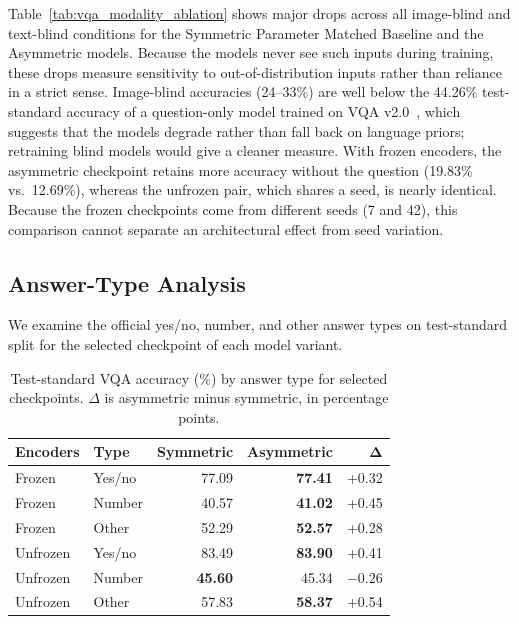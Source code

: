 \documentclass[conference]{IEEEtran}
\begin{document}
Table~\ref{tab:vqa_modality_ablation} shows major drops across all image-blind and text-blind conditions for the Symmetric Parameter Matched Baseline and the Asymmetric models. Because the models never see such inputs during training, these drops measure sensitivity to out-of-distribution inputs rather than reliance in a strict sense. Image-blind accuracies (24--33\%) are well below the 44.26\% test-standard accuracy of a question-only model trained on VQA v2.0~\cite{goyal2017making}, which suggests that the models degrade rather than fall back on language priors; retraining blind models would give a cleaner measure. With frozen encoders, the asymmetric checkpoint retains more accuracy without the question (19.83\% vs.\ 12.69\%), whereas the unfrozen pair, which shares a seed, is nearly identical. Because the frozen checkpoints come from different seeds (7 and 42), this comparison cannot separate an architectural effect from seed variation.

\subsection{Answer-Type Analysis}

We examine the official yes/no, number, and other answer types on test-standard split for the selected checkpoint of each model variant.

\begin{table}[t]
\centering
\caption{Test-standard VQA accuracy (\%) by answer type
for selected checkpoints. $\Delta$ is asymmetric minus symmetric,
in percentage points.}
\label{tab:vqa_answer_types}
\setlength{\tabcolsep}{3pt}
\renewcommand{\arraystretch}{1.05}
\begin{tabular}{llrrr}
\hline
\textbf{Encoders} & \textbf{Type} & \textbf{Symmetric}& \textbf{Asymmetric}& $\boldsymbol{\Delta}$ \\
\hline
Frozen & Yes/no & 77.09 & \textbf{77.41} & +0.32 \\
Frozen & Number & 40.57 & \textbf{41.02} & +0.45 \\
Frozen & Other  & 52.29 & \textbf{52.57} & +0.28 \\
\hline
Unfrozen & Yes/no & 83.49 & \textbf{83.90} & +0.41 \\
Unfrozen & Number & \textbf{45.60} & 45.34 & $-0.26$ \\
Unfrozen & Other  & 57.83 & \textbf{58.37} & +0.54 \\
\hline
\end{tabular}
\end{table}
\end{document}
